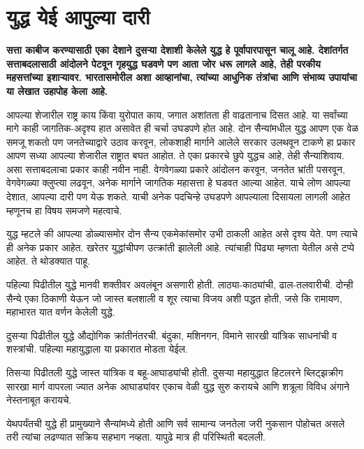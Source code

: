 \chapter{युद्ध येई आपुल्या दारी}

{\textbf{सत्ता काबीज करण्यासाठी एका देशाने दुसऱ्या देशाशी केलेले युद्ध हे पूर्वापारपासून चालू आहे. देशांतर्गत सत्ताबदलासाठी आंदोलने पेटवून गृहयुद्ध घडवणे पण आता जोर धरू लागले आहे, तेही परकीय महसत्तांच्या इशाऱ्यावर. भारतासमोरील अशा आव्हानांचा, त्यांच्या आधुनिक तंत्रांचा आणि संभाव्य उपायांचा या लेखात उहापोह केला आहे.}}

\vspace{1.5em}

आपल्या शेजारील राष्ट्र काय किंवा युरोपात काय, जगात अशांतता ही वाढतानाच दिसत आहे. या सर्वांच्या मागे काही जागतिक-अदृश्य हात असावेत ही चर्चा उघडपणे होत आहे. दोन सैन्यांमधील युद्ध आपण एक वेळ समजू शकतो पण जनतेच्याद्वारे उठाव करवून, लोकशाही मार्गाने आलेले सरकार उलथवून टाकणे हा प्रकार आपण सध्या आपल्या शेजारील राष्ट्रात बघत आहोत. ते एका प्रकारचे छुपे युद्धच आहे, तेही सैन्याशिवाय. असा सत्ताबदलाचा प्रकार काही नवीन नाही. वेगवेगळ्या प्रकारे आंदोलन करवून, जनतेत भ्रांती पसरवून, वेगवेगळ्या क्लुप्त्या लढवून, अनेक मार्गाने जागतिक महासत्ता हे घडवत आल्या आहेत. याचे लोण आपल्या देशात, आपल्या दारी पण येऊ शकते. याची अनेक पदचिन्हे उघडपणे आपल्याला दिसायला लागली आहेत म्हणूनच हा विषय समजणे महत्वाचे.

युद्ध म्हटले की आपल्या डोळ्यासमोर दोन सैन्य एकमेकांसमोर उभी ठाकली आहेत असे दृश्य येते. पण त्याचे ही अनेक प्रकार आहेत. खरेतर युद्धांचीपण उत्क्रांती झालेली आहे. त्यांचाही पिढ्या म्हणता येतील असे टप्पे आहेत. ते थोडक्यात पाहू.

पहिल्या पिढीतील युद्धे मानवी शक्तीवर अवलंबून असणारी होती. लाठ्या-काठ्यांची, ढाल-तलवारीची. दोन्ही सैन्ये एका ठिकाणी येऊन जो जास्त बलशाली व शूर त्याचा विजय अशी पद्धत होती, जसे कि रामायण, महाभारत यात वर्णन केलेली युद्धे.

दुसऱ्या पिढीतील युद्धे औद्योगिक क्रांतीनंतरची. बंदुका, मशिनगन, विमाने सारखी यांत्रिक साधनांची व शस्त्रांची. पहिल्या महायुद्धाला या प्रकारात मोडता येईल.

तिसऱ्या पिढीतली युद्धे जास्त यांत्रिक व बहू-आघाड्यांची होती. दुसऱ्या महायुद्धात हिटलरने ब्लिट्झक्रीग सारखा मार्ग वापरला ज्यात अनेक आघाड्यांवर एकाच वेळी युद्ध सुरु करायचे आणि शत्रूला विविध अंगाने नेस्तनाबूत करायचे.

येथपर्यंतची युद्धे ही प्रामुख्याने सैन्यांमध्ये होती आणि सर्व सामान्य जनतेला जरी नुकसान पोहोचत असले तरी त्यांचा लढण्यात सक्रिय सहभाग नव्हता. यापुढे मात्र ही परिस्थिती बदलली.

